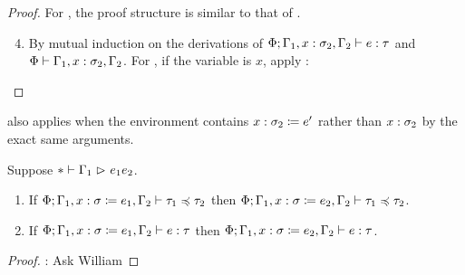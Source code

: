 \begin{proof}
  For ,
  the proof structure is similar to that of .
  \begin{enumerate}[noitemsep] \setcounter{enumi}{3}
    \item By mutual induction on the derivations of
      $\type{\Phi; \Gamma_1, \annot{x}{\sigma_2}, \Gamma_2}{e}{\tau}$ and
      $\wf{\Phi}{\Gamma_1, \annot{x}{\sigma_2}, \Gamma_2}$.
      For , if the variable is $x$, apply :
      \begin{mathpar}
      \end{mathpar}
  \end{enumerate}
\end{proof}

\begin{corollary}
 also applies when the environment contains
$\define{x}{\sigma_2}{e'}$ rather than $\annot{x}{\sigma_2}$
by the exact same arguments.
\end{corollary}

\begin{lemma} \label{lem:replacement-reduction}
Suppose $\red*{\Gamma_1}{e_1}{e_2}$.
\begin{enumerate}[noitemsep]
  \item If $\subtype{\Phi; \Gamma_1, \define{x}{\sigma}{e_1}, \Gamma_2}{\tau_1}{\tau_2}$
    then $\subtype{\Phi; \Gamma_1, \define{x}{\sigma}{e_2}, \Gamma_2}{\tau_1}{\tau_2}$.
  \item If $\type{\Phi; \Gamma_1, \define{x}{\sigma}{e_1}, \Gamma_2}{e}{\tau}$
    then $\type{\Phi; \Gamma_1, \define{x}{\sigma}{e_2}, \Gamma_2}{e}{\tau}$.
\end{enumerate}
\end{lemma}

\begin{proof}
\TODO: Ask William
\end{proof}

